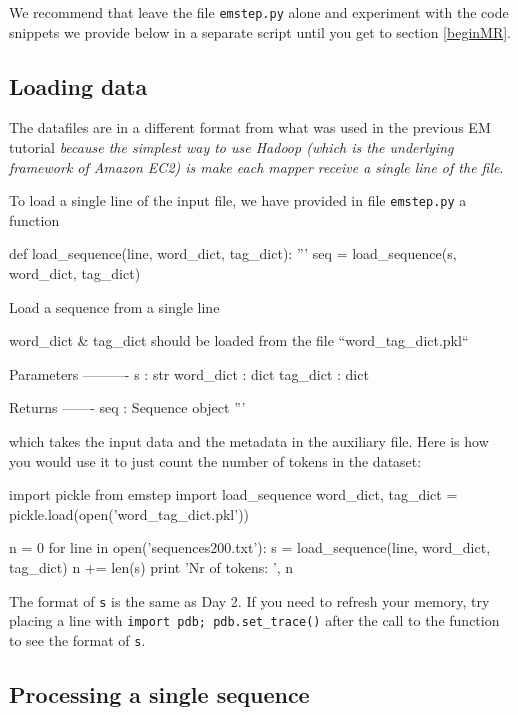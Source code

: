 We recommend that leave the file \verb+emstep.py+ alone and experiment with the code snippets we provide below in a separate script until you get to section \ref{beginMR}.

\subsection{Loading data}

The datafiles are in a different format from what was used in the previous EM
tutorial \emph{because the simplest way to use Hadoop (which is the underlying framework of Amazon EC2) is make each mapper
receive a single line of the file}.

To load a single line of the input file, we have provided in file {\texttt{emstep.py}} a function
\begin{python}
def load_sequence(line, word_dict, tag_dict):
    '''
    seq = load_sequence(s, word_dict, tag_dict)

    Load a sequence from a single line

    word_dict & tag_dict should be loaded from the file ``word_tag_dict.pkl``

    Parameters
    ----------
    s : str
    word_dict : dict
    tag_dict : dict

    Returns
    -------
    seq : Sequence object
    '''
\end{python}
which takes the
input data and the metadata in the auxiliary file. Here is how you would use it
to just count the number of tokens in the dataset:

\begin{python}
import pickle
from emstep import load_sequence
word_dict, tag_dict = pickle.load(open('word_tag_dict.pkl'))

n = 0
for line in open('sequences200.txt'):
    s = load_sequence(line, word_dict, tag_dict)
    n += len(s)
print 'Nr of tokens: ', n
\end{python}

The format of \texttt{s} is the same as Day 2. If you need to refresh your memory, try placing a line with \texttt{import pdb; pdb.set\_trace()} after the call to the function to see the format of \texttt{s}.

\subsection{Processing a single sequence}

